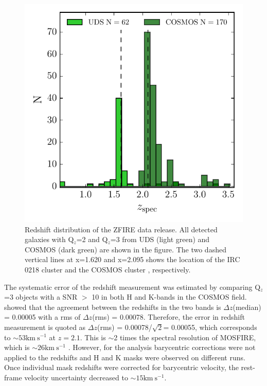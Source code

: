 \documentclass[iop]{emulateapj}
\begin{document}
\begin{figure}
\includegraphics[scale=0.85]{figures/zfire_zspec.pdf}
\caption{Redshift distribution of the ZFIRE data release. All detected galaxies with Q$_z$=2 and Q$_z$=3 from UDS (light green) and COSMOS (dark green) are shown in the figure. The two dashed vertical lines at x=1.620 and x=2.095 shows the location of the IRC 0218 cluster \citep{Tran2015} and the COSMOS cluster \citep{Yuan2014}, respectively.}
\label{fig:zspec}
\end{figure}




The systematic error of the redshift measurement was estimated by comparing Q$_z$=3 objects with a SNR $>$ 10 in both H and K-bands in the COSMOS field. 
\citet{Yuan2014} showed that the agreement between the redshifts in the two bands is $\Delta z$(median) = 0.00005 with a rms of $\Delta z$(rms) = 0.00078. Therefore, the error in redshift measurement is quoted as $\Delta z$(rms) = 0.00078/$\sqrt 2$= 0.00055, which corresponds to  $\sim\mathrm{53km~s^{-1}}$ at $z=2.1$.
This is $\sim$2 times the spectral resolution of MOSFIRE, which is $\sim\mathrm{26km~s^{-1}}$ \citep{Yuan2014}. However, for the \citet{Yuan2014} analysis barycentric corrections were not applied to the redshifts and H and K masks were observed on different runs. Once individual mask redshifts were corrected for barycentric velocity, the rest-frame velocity uncertainty  decreased to $\sim\mathrm{15km~s^{-1}}$. 
\end{document}

